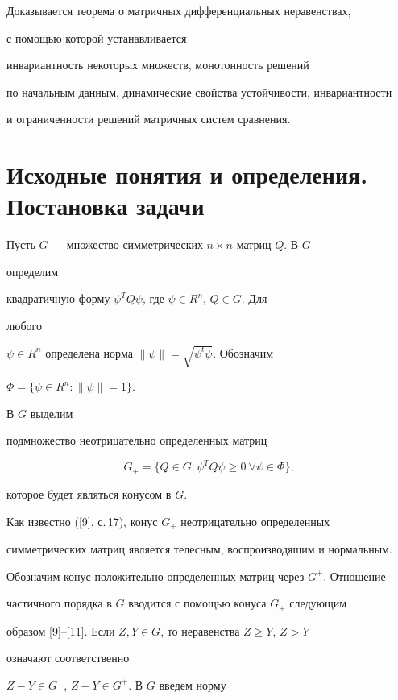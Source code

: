 Доказывается теорема о матричных дифференциальных неравенствах, 


с помощью которой устанавливается 


инвариантность некоторых множеств, монотонность решений 


по начальным данным, динамические свойства устойчивости, инвариантности 


и ограниченности решений матричных систем сравнения. 


 


\section{Исходные понятия и определения. Постановка задачи} 


 


Пусть $G$ --- множество симметрических $n\times n$-матриц $Q$. В $G$ 


определим 


квадратичную форму $\psi^T Q\psi$, где $\psi\in R^n$, $Q\in G$. Для 


любого 


$\psi\in R^n$ определена норма $\|\psi\|=\sqrt{\psi^t\psi}$. Обозначим 


$\Phi=\{\psi\in R^n:\|\psi\|=1\}$. 


В $G$ выделим 


подмножество неотрицательно определенных матриц 


$$ 


G_+=\{Q\in G:\psi^T Q\psi\ge0\ \forall\psi\in\Phi\}, 


$$ 


которое будет являться конусом в $G$. 


 


Как известно ([9], с.\,17), конус $G_+$ неотрицательно определенных 


симметрических матриц является телесным, воспроизводящим и нормальным. 


Обозначим конус положительно определенных матриц через $G^+$. Отношение 


частичного порядка в $G$ вводится с помощью конуса $G_+$ следующим 


образом [9]--[11]. Если $Z,Y\in G$, то неравенства $Z\ge Y$, $Z>Y$ 


означают соответственно 


$Z-Y\in G_+$, $Z-Y\in G^+$. В $G$ введем норму 


